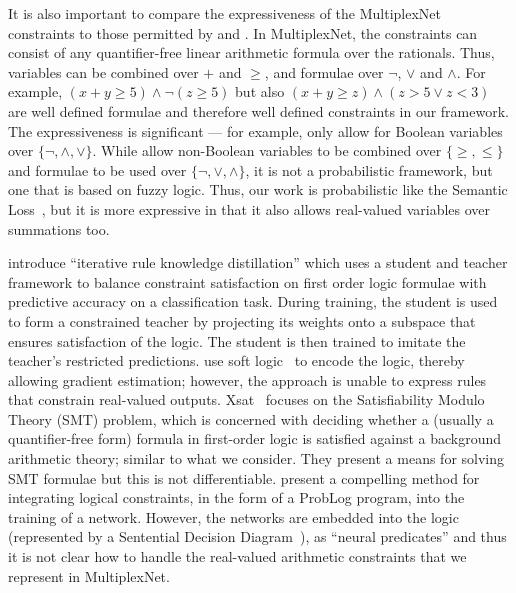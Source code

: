 \documentclass[letterpaper]{article} %
\begin{document}
It is also important to compare the expressiveness of the MultiplexNet constraints to those permitted by \citet{fischer2018dl2} and \citet{xu2017semantic}.
In MultiplexNet, the constraints can consist of any quantifier-free linear arithmetic formula over the rationals.
Thus, variables can be combined over $+$ and $\geq$, and formulae over $\neg$, $\lor$ and $\land$.
For example, $(x + y \geq 5) \land \neg (z \geq 5)$ but also $(x + y \geq z) \land (z > 5 \lor z < 3)$ are well defined formulae and therefore well defined constraints in our framework.
The expressiveness is significant --- for example, \citet{xu2017semantic} only allow for Boolean variables over $\{\neg, \land, \lor \}$.
While \citet{fischer2018dl2} allow non-Boolean variables to be combined over $\{ \geq, \leq \}$ and formulae to be used over $\{ \neg, \lor, \land \}$, it is not a probabilistic framework, but  one that is based on fuzzy logic.
Thus, our work is probabilistic like the Semantic Loss~\citep{xu2017semantic}, but it is more expressive in that it also allows real-valued variables over summations too.

\citet{hu2016harnessing} introduce ``iterative rule knowledge distillation'' which uses a student and teacher framework to balance constraint satisfaction on first order logic formulae with predictive accuracy on a classification task.
During training, the student is used to form a constrained teacher by projecting its weights onto a subspace that ensures satisfaction of the logic.
The student is then trained to imitate the teacher's restricted predictions.
\citet{hu2016harnessing} use soft logic~\citep{bach2017Hinge} to encode the logic, thereby allowing gradient estimation; however, the approach is unable to express rules that constrain real-valued outputs.
Xsat~\citep{Fu2016XSat} focuses on the Satisfiability Modulo Theory (SMT) problem, which is concerned with deciding whether a (usually a quantifier-free form) formula in first-order logic is satisfied against a background arithmetic theory; similar to what we consider.
They present a means for solving SMT formulae but this is not differentiable.
\citet{manhaeve2018deepproblog} present a compelling method for integrating logical constraints, in the form of a ProbLog program, into the training of a network.
However, the networks are embedded into the logic (represented by a Sentential Decision Diagram~\citep{darwiche2011sdd}), as ``neural predicates'' and thus it is not clear how to handle the real-valued arithmetic constraints that we represent in MultiplexNet.
\end{document}
